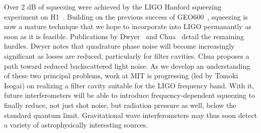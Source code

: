 
	    Over 2 dB of squeezing were achieved by the LIGO Hanford squeezing experiment on H1~\cite{BarsottiNatureSqueezing}. Building on the previous success of GEO600~\cite{GEO600NatureSqueezing}, squeezing is now a mature technique that we hope to incorporate into LIGO permanantly as soon as it is feasible.
Publications by Dwyer~\cite{DwyerPhaseNoise} and Chua~\cite{ChuaBackscatteredLight} detail the remaining hurdles.
Dwyer notes that quadrature phase noise will become increasingly significant as losses are reduced, particularly for filter cavities.
Chua proposes a path toward reduced backscattered light noise.
As we develop an understanding of these two principal problems, work at MIT is progressing (led by Tomoki Isogai) on realizing a filter cavity suitable for the LIGO frequency band.
With it, future interferometers will be able to introduce frequency-dependent squeezing to finally reduce, not just shot noise, but radiation pressure as well, below the standard quantum limit.
Gravitational wave interferometers may thus soon detect a variety of astrophysically interesting sources.





